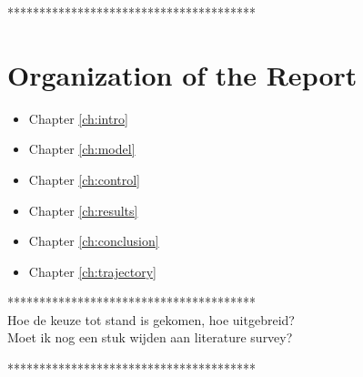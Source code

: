 ***************************************\\

\section{Organization of the Report}
\begin{itemize}
	\item Chapter \ref{ch:intro}
	\item Chapter \ref{ch:model}
	\item Chapter \ref{ch:control}
	\item Chapter \ref{ch:results}
	\item Chapter \ref{ch:conclusion}
	\item Chapter \ref{ch:trajectory}
\end{itemize}

***************************************\\
Hoe de keuze tot stand is gekomen, hoe uitgebreid? \\
Moet ik nog een stuk wijden aan literature survey?

***************************************\\
